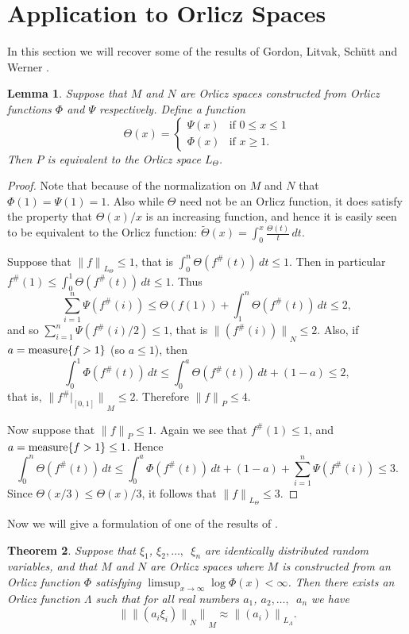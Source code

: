 \documentclass[12pt]{amsart}
\newtheorem{thm}{Theorem}
\newtheorem{lemma}[thm]{Lemma}
\newcommand{\snormo}[1]{{\mathopen\|#1\mathclose\|}}
\newcommand{\measure}{\text{\rm measure}}
\begin{document}
\section{Application to Orlicz Spaces}

In this section we will recover some of the results of
Gordon, Litvak, Sch\"utt and Werner \cite{gordon et al}.

\begin{lemma}
\label{l equiv}
Suppose that $M$ and $N$ are Orlicz spaces constructed
from Orlicz functions $\Phi$ and $\Psi$ respectively.  
Define a function
\[
   \Theta(x) = \left\{
   \begin{array}{cl}
     \Psi(x) & \text{if }0\le x \le 1\\
     \Phi(x) & \text{if }x \ge 1.
   \end{array} \right.
\]
Then $P$ is equivalent to the Orlicz space $L_\Theta$.
\end{lemma}

\begin{proof}
Note that because of the normalization on $M$ and $N$ that 
$\Phi(1) = \Psi(1) = 1$.  Also while
$\Theta$ need not be an Orlicz function, 
it does satisfy the property that $\Theta(x)/x$ is an increasing 
function, and hence it is easily seen to
be equivalent
to the Orlicz function:
$\tilde\Theta(x) = \int_0^x \frac{\Theta(t)} t \, dt $.

Suppose that $\snormo f_{L_\Theta} \le 1$, that is
$\int_0^n \Theta(f^\#(t)) \, dt \le 1 $.
Then in particular $f^\#(1) \le \int_0^1 \Theta(f^\#(t)) \, dt \le 1 $.
Thus
\[
   \sum_{i=1}^n \Psi(f^\#(i)) \le \Theta(f(1)) + 
     \int_1^n \Theta(f^\#(t)) \, dt \le 2 ,
\]
and so $\sum_{i=1}^n \Psi(f^\#(i)/2) \le 1$, that is 
$\snormo{(f^\#(i))}_N \le 2$.
Also, if $a = \measure\{f>1\}$ (so $a\le 1$), then
\[
   \int_0^1 \Phi(f^\#(t)) \, dt \le
   \int_0^a \Theta(f^\#(t)) \, dt + (1-a) \le 2,
\]
that is, $\snormo{f^\#|_{[0,1]}}_M \le 2$.  Therefore $\snormo f_P \le 4$.

Now suppose that $\snormo f_P \le 1$.  Again we see that $f^\#(1) \le 1$,
and $a = \measure\{f>1\} \le 1$.  Hence
\[
   \int_0^n \Theta(f^\#(t)) \, dt \le
   \int_0^a \Phi(f^\#(t)) \, dt + (1-a) + 
   \sum_{i=1}^n \Psi(f^\#(i)) \le 3 .
\]
Since $\Theta(x/3) \le \Theta(x)/3$, it follows that
$\snormo f_{L_\Theta} \le 3$.
\end{proof}

Now we will give a formulation of one of the results of
\cite{gordon et al}.

\begin{thm}
\label{t orlicz}
Suppose that $\xi_1$, 
$\xi_2,\dots,$\ $\xi_n$ are identically distributed random variables,
and that $M$ and $N$ are Orlicz spaces where 
$M$ is constructed from an Orlicz function
$\Phi$ satisfying $\limsup_{x\to\infty} \log \Phi(x) < \infty$.
Then there exists an Orlicz
function $\Lambda$ such that for all real numbers
$a_1$, $a_2,\dots,$\ $a_n$ we have
\[
   \snormo{\snormo{(a_i \xi_i)}_N}_M \approx \snormo{(a_i)}_{L_\Lambda} .
\]
\end{thm}
\end{document}

